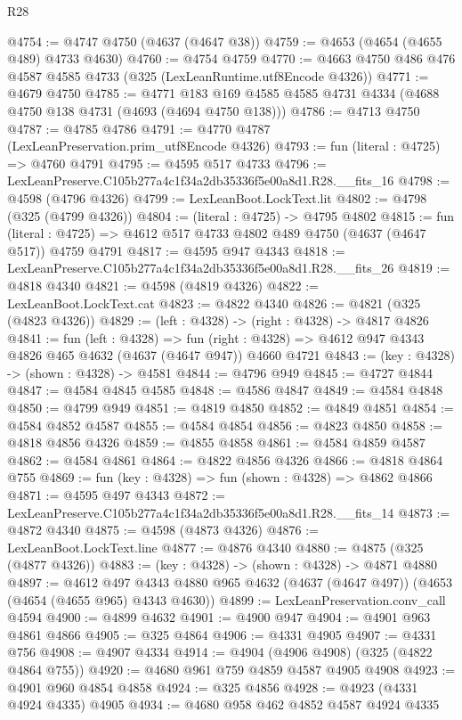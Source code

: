 \begin{lexlean}{R28}
\begin{coremodule}
@4754 := @4747 @4750 (@4637 (@4647 @38))
@4759 := @4653 (@4654 (@4655 @489) @4733 @4630)
@4760 := @4754 @4759
@4770 := @4663 @4750 @486 @476 @4587 @4585 @4733 (@325 (LexLeanRuntime.utf8Encode @4326))
@4771 := @4679 @4750
@4785 := @4771 @183 @169 @4585 @4585 @4731 @4334 (@4688 @4750 @138 @4731 (@4693 (@4694 @4750 @138)))
@4786 := @4713 @4750
@4787 := @4785 @4786
@4791 := @4770 @4787 (LexLeanPreservation.prim_utf8Encode @4326)
@4793 := fun (literal : @4725) => @4760 @4791
@4795 := @4595 @517 @4733
@4796 := LexLeanPreserve.C105b277a4c1f34a2db35336f5e00a8d1.R28.__fits_16
@4798 := @4598 (@4796 @4326)
@4799 := LexLeanBoot.LockText.lit
@4802 := @4798 (@325 (@4799 @4326))
@4804 := (literal : @4725) -> @4795 @4802
@4815 := fun (literal : @4725) => @4612 @517 @4733 @4802 @489 @4750 (@4637 (@4647 @517)) @4759 @4791
@4817 := @4595 @947 @4343
@4818 := LexLeanPreserve.C105b277a4c1f34a2db35336f5e00a8d1.R28.__fits_26
@4819 := @4818 @4340
@4821 := @4598 (@4819 @4326)
@4822 := LexLeanBoot.LockText.cat
@4823 := @4822 @4340
@4826 := @4821 (@325 (@4823 @4326))
@4829 := (left : @4328) -> (right : @4328) -> @4817 @4826
@4841 := fun (left : @4328) =>
  fun (right : @4328) => @4612 @947 @4343 @4826 @465 @4632 (@4637 (@4647 @947)) @4660 @4721
@4843 := (key : @4328) -> (shown : @4328) -> @4581
@4844 := @4796 @949
@4845 := @4727 @4844
@4847 := @4584 @4845 @4585
@4848 := @4586 @4847
@4849 := @4584 @4848
@4850 := @4799 @949
@4851 := @4819 @4850
@4852 := @4849 @4851
@4854 := @4584 @4852 @4587
@4855 := @4584 @4854
@4856 := @4823 @4850
@4858 := @4818 @4856 @4326
@4859 := @4855 @4858
@4861 := @4584 @4859 @4587
@4862 := @4584 @4861
@4864 := @4822 @4856 @4326
@4866 := @4818 @4864 @755
@4869 := fun (key : @4328) => fun (shown : @4328) => @4862 @4866
@4871 := @4595 @497 @4343
@4872 := LexLeanPreserve.C105b277a4c1f34a2db35336f5e00a8d1.R28.__fits_14
@4873 := @4872 @4340
@4875 := @4598 (@4873 @4326)
@4876 := LexLeanBoot.LockText.line
@4877 := @4876 @4340
@4880 := @4875 (@325 (@4877 @4326))
@4883 := (key : @4328) -> (shown : @4328) -> @4871 @4880
@4897 := @4612
    @497
    @4343
    @4880
    @965
    @4632
    (@4637 (@4647 @497))
    (@4653 (@4654 (@4655 @965) @4343 @4630))
@4899 := LexLeanPreservation.conv_call @4594
@4900 := @4899 @4632
@4901 := @4900 @947
@4904 := @4901 @963 @4861 @4866
@4905 := @325 @4864
@4906 := @4331 @4905
@4907 := @4331 @756
@4908 := @4907 @4334
@4914 := @4904 (@4906 @4908) (@325 (@4822 @4864 @755))
@4920 := @4680 @961 @759 @4859 @4587 @4905 @4908
@4923 := @4901 @960 @4854 @4858
@4924 := @325 @4856
@4928 := @4923 (@4331 @4924 @4335) @4905
@4934 := @4680 @958 @462 @4852 @4587 @4924 @4335

\end{coremodule}
\end{lexlean}
